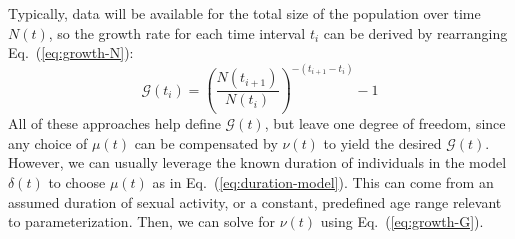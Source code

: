 \par
Typically, data will be available for the total size of the population over time $N(t)$,
so the growth rate for each time interval $t_i$
can be derived by rearranging Eq.~(\ref{eq:growth-N}):
\begin{equation}
\mathcal{G}(t_i) = {\left(\frac{N(t_{i+1})}{N(t_{i})}\right)}^{-(t_{i+1}-t_i)} - 1
\end{equation}
All of these approaches help define $\mathcal{G}(t)$, but leave one degree of freedom,
since any choice of $\mu(t)$ can be compensated by $\nu(t)$ to yield the desired $\mathcal{G}(t)$.
However, we can usually leverage the known duration of individuals in the model $\delta(t)$
to choose $\mu(t)$ as in Eq.~(\ref{eq:duration-model}).
This can come from an assumed duration of sexual activity,
or a constant, predefined age range relevant to parameterization.
Then, we can solve for $\nu(t)$ using Eq.~(\ref{eq:growth-G}).
